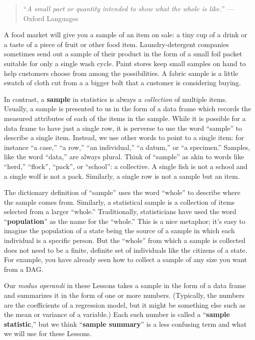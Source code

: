\documentclass[
  letterpaper,
  DIV=11,
  numbers=noendperiod,
  oneside]{scrreprt}
\begin{document}
\begin{quote}
``\emph{A small part or quantity intended to show what the whole is
like.}'' --- Oxford Languages
\end{quote}

A food market will give you a sample of an item on sale: a tiny cup of a
drink or a taste of a piece of fruit or other food item.
Laundry-detergent companies sometimes send out a sample of their product
in the form of a small foil packet suitable for only a single wash
cycle. Paint stores keep small samples on hand to help customers choose
from among the possibilities. A fabric sample is a little swatch of
cloth cut from a a bigger bolt that a customer is considering buying.

In contrast, a \textbf{sample} in statistics is always a
\emph{collection} of multiple items. Usually, a sample is presented to
us in the form of a data frame which records the measured attributes of
each of the items in the sample. While it is possible for a data frame
to have just a single row, it is perverse to use the word ``sample'' to
describe a single item. Instead, we use other words to point to a single
item: for instance ``a case,'' ``a row,'' ``an individual,'' ``a
datum,'' or ``a specimen.'' Samples, like the word ``data,'' are always
plural. Think of ``sample'' as akin to words like ``herd,'' ``flock'',
``pack'', or ``school'': a collective. A single fish is not a school and
a single wolf is not a pack. Similarly, a single row is not a sample but
an item.

The dictionary definition of ``sample'' uses the word ``whole'' to
describe where the sample comes from. Similarly, a statistical sample is
a collection of items selected from a larger ``whole.'' Traditionally,
statisticians have used the word ``\textbf{population}'' as the name for
the ``whole.'' This is a nice metaphor; it's easy to imagine the
population of a state being the source of a sample in which each
individual is a specific person. But the ``whole'' from which a sample
is collected does not need to be a finite, definite set of individuals
like the citizens of a state. For example, you have already seen how to
collect a sample of any size you want from a DAG.

Our \emph{modus operandi} in these Lessons takes a sample in the form of
a data frame and summarizes it in the form of one or more numbers.
(Typically, the numbers are the coefficients of a regression model, but
it might be something else such as the mean or variance of a variable.)
Each such number is called a ``\textbf{sample statistic},'' but we think
``\textbf{sample summary}'' is a less confusing term and what we will
use for these Lessons.
\end{document}
